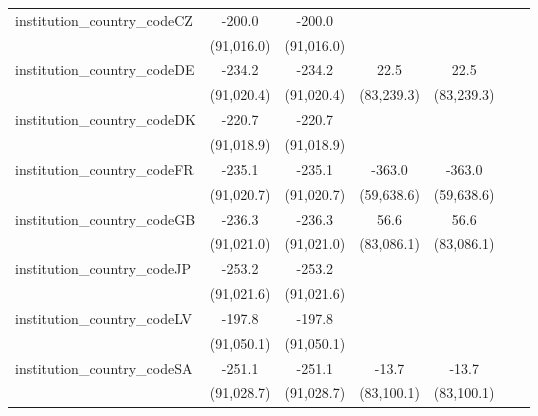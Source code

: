 \begin{tabular}{lcccccc}
   institution\_country\_codeCZ          & -200.0       & -200.0       &             &             &               &   \\   
                                         & (91,016.0)   & (91,016.0)   &             &             &               &   \\   
   institution\_country\_codeDE          & -234.2       & -234.2       & 22.5        & 22.5        &               &   \\   
                                         & (91,020.4)   & (91,020.4)   & (83,239.3)  & (83,239.3)  &               &   \\   
   institution\_country\_codeDK          & -220.7       & -220.7       &             &             &               &   \\   
                                         & (91,018.9)   & (91,018.9)   &             &             &               &   \\   
   institution\_country\_codeFR          & -235.1       & -235.1       & -363.0      & -363.0      &               &   \\   
                                         & (91,020.7)   & (91,020.7)   & (59,638.6)  & (59,638.6)  &               &   \\   
   institution\_country\_codeGB          & -236.3       & -236.3       & 56.6        & 56.6        &               &   \\   
                                         & (91,021.0)   & (91,021.0)   & (83,086.1)  & (83,086.1)  &               &   \\   
   institution\_country\_codeJP          & -253.2       & -253.2       &             &             &               &   \\   
                                         & (91,021.6)   & (91,021.6)   &             &             &               &   \\   
   institution\_country\_codeLV          & -197.8       & -197.8       &             &             &               &   \\   
                                         & (91,050.1)   & (91,050.1)   &             &             &               &   \\   
   institution\_country\_codeSA          & -251.1       & -251.1       & -13.7       & -13.7       &               &   \\   
                                         & (91,028.7)   & (91,028.7)   & (83,100.1)  & (83,100.1)  &               &   \\   

\end{tabular}
